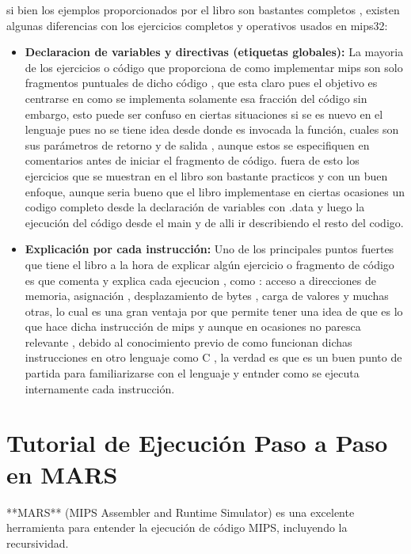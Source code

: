 \documentclass{article}
\begin{document}
si bien los ejemplos proporcionados por el libro son bastantes completos , existen algunas diferencias con los ejercicios completos y operativos usados en mips32:

\begin{itemize}
	\item \textbf{Declaracion de variables y directivas (etiquetas globales):} La mayoria de los ejercicios o código que proporciona de como implementar mips son solo fragmentos puntuales de dicho código , que esta claro pues el objetivo es centrarse  en como se implementa solamente esa fracción del código sin embargo, esto puede ser confuso en ciertas situaciones si se es nuevo en el lenguaje pues no se tiene idea desde donde es invocada la función, cuales son sus parámetros de retorno y de salida , aunque estos se especifiquen en comentarios antes de iniciar el fragmento de código. fuera de esto los ejercicios que se muestran en el libro son bastante practicos y con un buen enfoque, aunque seria bueno que el libro implementase en ciertas ocasiones un codigo completo desde la declaración de variables con .data y luego la ejecución del código desde el main y de alli ir describiendo el resto del codigo.
\end{itemize}

\begin{itemize}
	\item \textbf{Explicación por cada instrucción:}  Uno de los principales puntos fuertes que tiene el libro a la hora de explicar algún ejercicio o fragmento de código es que comenta y explica cada ejecucion , como : acceso a direcciones de memoria, asignación , desplazamiento de bytes , carga de valores y muchas otras, lo cual es una gran ventaja por que permite tener una idea de que es lo que hace dicha instrucción de mips y aunque en ocasiones no paresca relevante , debido al conocimiento previo de como funcionan dichas instrucciones en otro lenguaje como C , la verdad es que es un buen punto de partida para familiarizarse con el lenguaje y entnder como se ejecuta internamente cada instrucción.
\end{itemize}



\section{Tutorial de Ejecución Paso a Paso en MARS}

**MARS** (MIPS Assembler and Runtime Simulator) es una excelente herramienta para entender la ejecución de código MIPS, incluyendo la recursividad.
\end{document}
